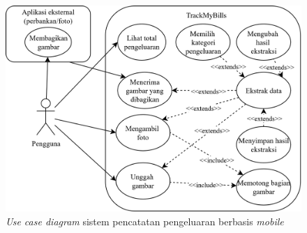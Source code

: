
\begin{figure}[htbp]
    \centering
    \includegraphics[width=1\textwidth]{images/use-case-diagram.png}
    \caption{\emph{Use case diagram} sistem pencatatan pengeluaran berbasis \emph{mobile}}
    \label{fig:use-case-diagram}
\end{figure}

